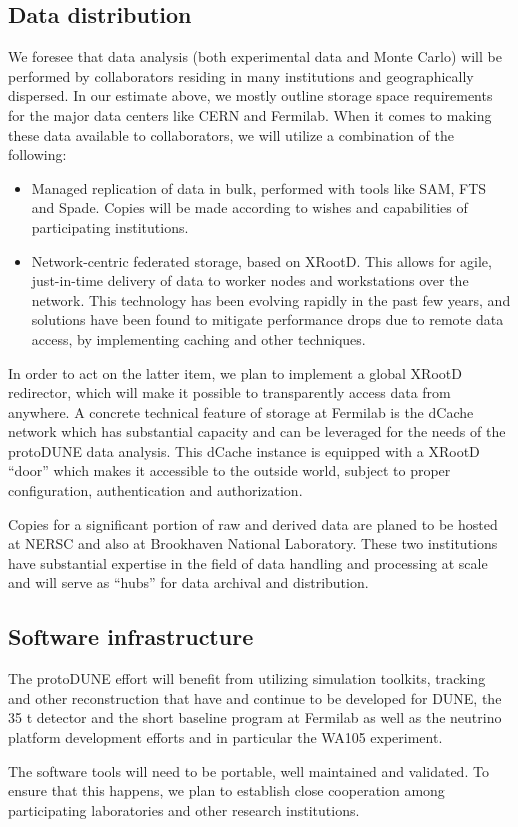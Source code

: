 \subsection{Data distribution}
We foresee that data analysis (both experimental data and Monte Carlo) will be performed by collaborators residing in many 
institutions and geographically dispersed. In our
estimate above, we mostly outline storage space requirements for the
major data centers like CERN and Fermilab. When it comes to making these data available to collaborators, we will utilize a combination of the following:
\begin{itemize}
\item Managed replication of data in bulk, performed with tools like SAM, FTS and Spade. Copies will be made according to wishes and capabilities of participating institutions.
\item Network-centric federated storage, based on XRootD. This allows for agile, just-in-time delivery of data to worker nodes and workstations over the network. This
technology has been evolving rapidly in the past few years, and solutions have been found to mitigate performance drops due to remote data access, by implementing caching and other techniques.
\end{itemize}

In order to act on the latter item, we plan to implement a global XRootD redirector, which will make it possible to transparently access data from anywhere.
A concrete technical feature of storage at Fermilab is the dCache network which has substantial capacity and can be leveraged
for the needs of the protoDUNE data analysis. This dCache instance is equipped with a XRootD ``door'' which makes it accessible to the outside world, subject
to proper configuration, authentication and authorization.


Copies for a significant portion of raw and derived data are planed to be hosted at NERSC and also at Brookhaven National Laboratory.
These two institutions have substantial expertise  in the field of data handling and processing at scale and will serve as ``hubs'' for data archival and distribution.


\subsection{Software infrastructure}

The protoDUNE effort will benefit from utilizing simulation toolkits, tracking and other reconstruction
that have and continue to be developed for DUNE, the 35 t detector and the short baseline program at Fermilab as well as the 
neutrino platform development efforts and in particular the WA105 experiment.

The software tools will need to be portable, well maintained and validated. To ensure that this happens,
we plan to establish close cooperation among participating laboratories and other research institutions.



